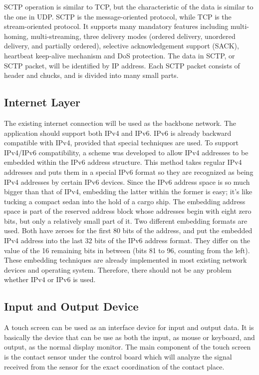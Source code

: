 \documentclass[conference]{IEEEtran}
\begin{document}
SCTP operation is similar to TCP, but the characteristic of the data is similar to the one in UDP. SCTP is the message-oriented protocol, while TCP is the stream-oriented protocol. It supports many mandatory features including multi-homing, multi-streaming, three delivery modes (ordered delivery, unordered delivery, and partially ordered), selective acknowledgement support (SACK), heartbeat keep-alive mechanism and DoS protection. The data in SCTP, or SCTP packet, will be identified by IP address. Each SCTP packet consists of header and chucks, and is divided into many small parts. 
\subsection{Internet Layer}
The existing internet connection will be used as the backbone network. The application should support both IPv4 and IPv6. IPv6 is already backward compatible with IPv4, provided that special techniques are used. To support IPv4/IPv6 compatibility, a scheme was developed to allow IPv4 addresses to be embedded within the IPv6 address structure. This method takes regular IPv4 addresses and puts them in a special IPv6 format so they are recognized as being IPv4 addresses by certain IPv6 devices.
Since the IPv6 address space is so much bigger than that of IPv4, embedding the latter within the former is easy; it's like tucking a compact sedan into the hold of a cargo ship. The embedding address space is part of the reserved address block whose addresses begin with eight zero bits, but only a relatively small part of it. Two different embedding formats are used. Both have zeroes for the first 80 bits of the address, and put the embedded IPv4 address into the last 32 bits of the IPv6 address format. They differ on the value of the 16 remaining bits in between (bits 81 to 96, counting from the left). These embedding techniques are already implemented in most existing network devices and operating system. Therefore, there should not be any problem whether IPv4 or IPv6 is used.
\subsection{Input and Output Device}
A touch screen can be used as an interface device for input and output data. It is basically the device that can be use as both the input, as mouse or keyboard, and output, as the normal display monitor. The main component of the touch screen is the contact sensor under the control board which will analyze the signal received from the sensor for the exact coordination of the contact place. 
\end{document}
